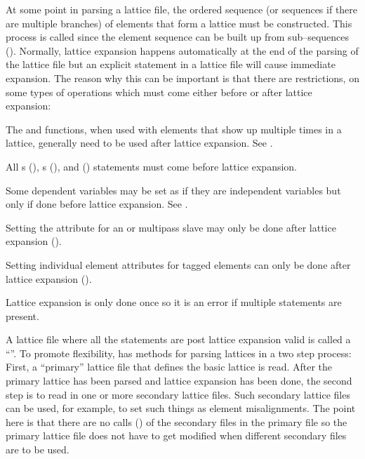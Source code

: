 {{At some point in parsing a lattice file, the ordered sequence (or
sequences if there are multiple branches) of elements that form a
lattice must be constructed. This process is called  since the element sequence can be built up from
sub--sequences (). Normally, lattice expansion
happens automatically at the end of the parsing of the lattice file
but an explicit  statement in a lattice file will
cause immediate expansion. The reason why this can be important is
that there are restrictions, on some types of operations which must
come either before or after lattice expansion:
\begin{Itemize}
\item 
{}
The  and  functions, when used with elements
that show up multiple times in a lattice, generally need to be used
after lattice expansion. See .
\item
{}
All s (), s
(), and  () statements must
come before lattice expansion.
\item
Some dependent variables may be set as if they are independent
variables but only if done before lattice expansion. See .
\item 
Setting the  attribute for an 
 or  multipass
slave may only be done after lattice expansion ().
\item
{}
Setting individual element attributes for tagged elements can only be done
after lattice expansion ().
\end{Itemize}

Lattice expansion is only done once so it is an error if multiple
 statements are present.

A lattice file where all the statements are post lattice expansion
valid is called a ``''.  To promote
flexibility, \bmad has methods for parsing lattices in a two step
process: First, a ``primary'' lattice file that defines the basic
lattice is read. After the primary lattice has been parsed and lattice
expansion has been done, the second step is to read in one or more
secondary lattice files. Such secondary lattice files can be used, for
example, to set such things as element misalignments. The point here
is that there are no calls () of the secondary files in
the primary file so the primary lattice file does not have to get
modified when different secondary files are to be used.

}}
